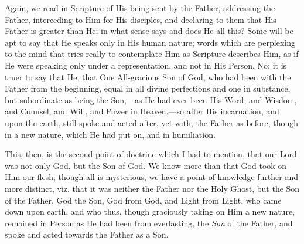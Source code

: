 Again, we read in Scripture of His being sent by the Father,
addressing the Father, interceding to Him for His disciples, and
declaring to them that His Father is greater than He; in what sense says
and does He all this? Some will be apt to say that He speaks only in His
human nature; words which are perplexing to the mind that tries really
to contemplate Him as Scripture describes Him, as if He were speaking
only under a representation, and not in His Person. No; it is truer to
say that He, that One All-gracious Son of God, who had been with the
Father from the beginning, equal in all divine perfections and one in
substance, but subordinate as being the Son,—as He had ever been His
Word, and Wisdom, and Counsel, and Will, and Power in Heaven,—so after
His incarnation, and upon the earth, still spoke and acted after, yet
with, the Father as before, though in a new nature, which He had put on,
and in humiliation.

This, then, is the second point of doctrine which I had to mention,
that our Lord was not only God, but the Son of God. We know more than
that God took on Him our flesh; though all is mysterious, we have a
point of knowledge further and more distinct, viz. that it was neither
the Father nor the Holy Ghost, but the Son of the Father, God the Son,
God from God, and Light from Light, who came down upon earth, and who
thus, though graciously taking on Him a new nature, remained in Person
as He had been from everlasting, the \emph{Son} of the Father, and spoke and
acted towards the Father as a Son.

